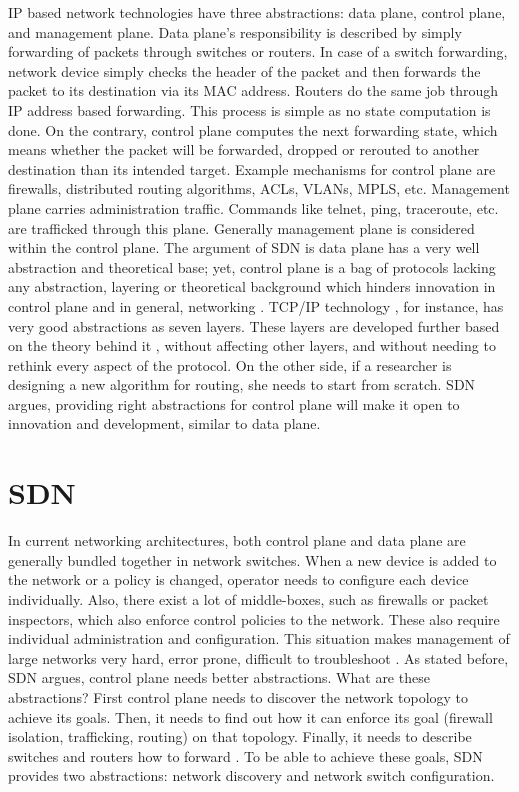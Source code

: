 \documentclass[12pt,journal,compsoc]{IEEEtran}
\begin{document}
 IP based network technologies have three abstractions: 
data plane, control plane, and management plane. Data plane's responsibility 
is described by simply forwarding of packets through switches or routers. 
In case of a switch forwarding, network device simply checks the header 
of the packet and then forwards the packet to its destination via its 
MAC address. Routers do the same job through IP address based forwarding. 
This process is simple as no state computation is done. On the 
contrary, control plane computes the next forwarding state, which means 
whether the packet will be forwarded, dropped or rerouted to another 
destination than its intended target. Example mechanisms for control plane 
are firewalls, distributed routing algorithms, ACLs, VLANs, MPLS, etc. 
Management plane carries administration traffic. Commands like telnet, 
ping, traceroute, etc. are trafficked through this plane. 
Generally management plane is considered within the control plane. 
The argument of SDN is data plane has a very well abstraction and theoretical 
base; yet, control plane is a bag of protocols lacking 
any abstraction, layering or theoretical background which hinders innovation 
in control plane and in general, networking \cite{shenker1}. TCP/IP technology
, for instance, has very good abstractions as seven layers. 
These layers are developed further based on the theory behind it
, without affecting other layers, and without needing to rethink every 
aspect of the protocol. On the other side, if a researcher is designing 
a new algorithm for routing, she needs to start from scratch. 
SDN argues, providing right abstractions for control plane will 
make it open to innovation and development, similar to data plane. 

\section{SDN}
In current networking architectures, both control plane and data plane are generally 
bundled together in network switches. When a new device is added to the network 
or a policy is changed, operator needs to configure each device individually. 
Also, there exist a lot of middle-boxes, such as firewalls or packet inspectors, 
which also enforce control policies to the network. These also require individual 
administration and configuration. This situation makes management of large 
networks very hard, error prone, difficult to troubleshoot \cite{keown2}. As stated before, 
SDN argues, control plane needs better abstractions. What are these 
abstractions? First control plane needs to discover the network topology 
to achieve its goals. Then, it needs to find out how it can enforce its 
goal (firewall isolation, trafficking, routing) on that topology. 
Finally, it needs to describe switches and routers how to forward \cite{casado2}. To 
be able to achieve these goals, SDN provides two abstractions: 
network discovery and network switch configuration.
\end{document}
